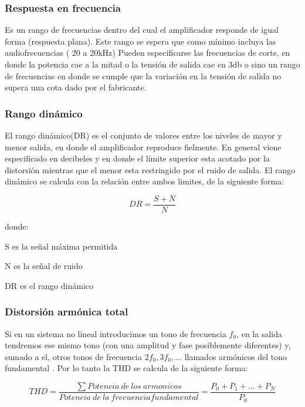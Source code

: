 \subsubsection*{Respuesta en frecuencia}

Es un rango de frecuencias dentro del cual el amplificador responde de igual forma (respuesta plana). Este rango se espera que como mínimo incluya las audiofrecuencias ( 20 a 20kHz)
Pueden especificarse las frecuencias de corte, en donde la potencia cae a la mitad o la tensión de salida cae en 3db o sino un rango de frecuencias en donde se cumple que la variación en la tensión de salida no supera una cota dado por el fabricante.
\medskip 
\subsubsection*{Rango dinámico}

El rango dinámico(DR) es el conjunto de valores entre los niveles de mayor y menor salida, en donde el amplificador reproduce fielmente. En general viene especificado en decibeles y en donde el límite superior esta acotado por la distorsión mientras que el menor esta restringido por el ruido de salida. El rango dinámico se calcula con la relación entre ambos limites, de la siguiente forma:

\begin{equation}\label{rango_dinamico_eq}
DR= \frac{S+N}{N}
\end{equation}

donde:
\begin{description}
\item S es la señal máxima permitida
\item N es la señal de ruido
\item DR es el rango dinámico
\end{description}
\medskip 
\subsubsection*{Distorsión armónica total}

Si en un sistema no lineal introducimos un tono de frecuencia $f_0$, en la salida tendremos ese mismo tono (con una amplitud y fase posiblemente diferentes) y, sumado a el, otros tonos de frecuencia $2f_0, 3f_0, ...$ llamados armónicos del tono fundamental . Por lo tanto la THD se calcula de la siguiente forma:

\begin{equation}\label{THD_eq}
THD= \frac{\sum Potencia~de ~los ~armonicos}{Potencia~ de ~la ~frecuencia fundamental}=\frac{P_0+P_1+...+P_N}{P_0}
\end{equation}

